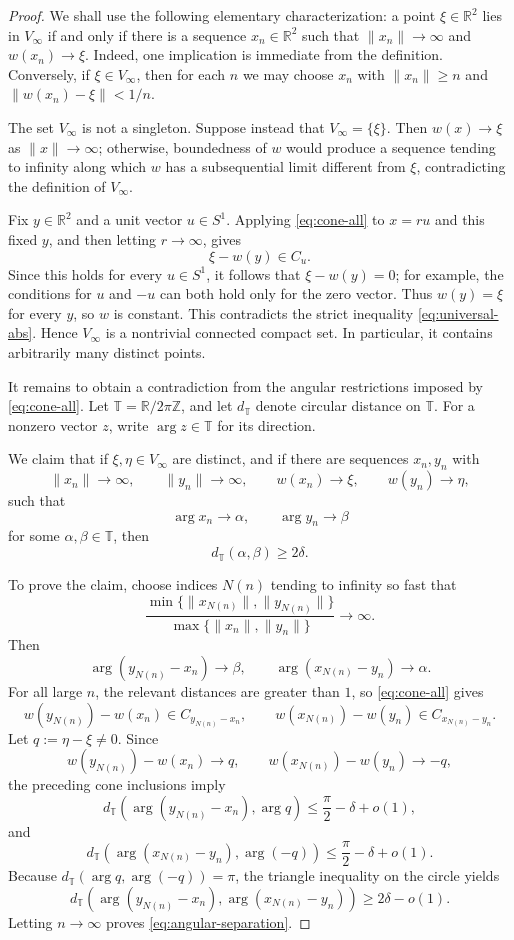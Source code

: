 \documentclass[10pt,a4paper]{amsart}
\begin{document}
\begin{proof}
We shall use the following elementary characterization: a point $\xi\in\mathbb R^2$ lies in $V_\infty$ if and only if there is a sequence $x_n\in\mathbb R^2$ such that $\|x_n\|\to\infty$ and $w(x_n)\to\xi$. Indeed, one implication is immediate from the definition. Conversely, if $\xi\in V_\infty$, then for each $n$ we may choose $x_n$ with $\|x_n\|\ge n$ and $\|w(x_n)-\xi\|<1/n$.

The set $V_\infty$ is not a singleton. Suppose instead that $V_\infty=\{\xi\}$. Then $w(x)\to\xi$ as $\|x\|\to\infty$; otherwise, boundedness of $w$ would produce a sequence tending to infinity along which $w$ has a subsequential limit different from $\xi$, contradicting the definition of $V_\infty$.

Fix $y\in\mathbb R^2$ and a unit vector $u\in S^1$. Applying \eqref{eq:cone-all} to $x=ru$ and this fixed $y$, and then letting $r\to\infty$, gives
\[
\xi-w(y)\in C_u.
\]
Since this holds for every $u\in S^1$, it follows that $\xi-w(y)=0$; for example, the conditions for $u$ and $-u$ can both hold only for the zero vector. Thus $w(y)=\xi$ for every $y$, so $w$ is constant. This contradicts the strict inequality \eqref{eq:universal-abs}. Hence $V_\infty$ is a nontrivial connected compact set. In particular, it contains arbitrarily many distinct points.

It remains to obtain a contradiction from the angular restrictions imposed by \eqref{eq:cone-all}. Let $\mathbb T=\mathbb R/2\pi\mathbb Z$, and let $d_{\mathbb T}$ denote circular distance on $\mathbb T$. For a nonzero vector $z$, write $\arg z\in\mathbb T$ for its direction.

We claim that if $\xi,\eta\in V_\infty$ are distinct, and if there are sequences $x_n,y_n$ with
\[
\|x_n\|\to\infty,
\qquad
\|y_n\|\to\infty,
\qquad
w(x_n)\to\xi,
\qquad
w(y_n)\to\eta,
\]
such that
\[
\arg x_n\to\alpha,
\qquad
\arg y_n\to\beta
\]
for some $\alpha,\beta\in\mathbb T$, then
\begin{equation}\label{eq:angular-separation}
d_{\mathbb T}(\alpha,\beta)\ge 2\delta .
\end{equation}

To prove the claim, choose indices $N(n)$ tending to infinity so fast that
\[
\frac{\min\{\|x_{N(n)}\|,\|y_{N(n)}\|\}}
{\max\{\|x_n\|,\|y_n\|\}}
\longrightarrow \infty .
\]
Then
\[
\arg (y_{N(n)}-x_n)\to\beta,
\qquad
\arg (x_{N(n)}-y_n)\to\alpha .
\]
For all large $n$, the relevant distances are greater than $1$, so \eqref{eq:cone-all} gives
\[
w(y_{N(n)})-w(x_n)\in C_{y_{N(n)}-x_n},
\qquad
w(x_{N(n)})-w(y_n)\in C_{x_{N(n)}-y_n}.
\]
Let $q:=\eta-\xi\ne 0$. Since
\[
w(y_{N(n)})-w(x_n)\to q,
\qquad
w(x_{N(n)})-w(y_n)\to -q,
\]
the preceding cone inclusions imply
\[
d_{\mathbb T}(\arg (y_{N(n)}-x_n),\arg q)
\le \frac{\pi}{2}-\delta+o(1),
\]
and
\[
d_{\mathbb T}(\arg (x_{N(n)}-y_n),\arg(-q))
\le \frac{\pi}{2}-\delta+o(1).
\]
Because $d_{\mathbb T}(\arg q,\arg(-q))=\pi$, the triangle inequality on the circle yields
\[
d_{\mathbb T}(\arg (y_{N(n)}-x_n),\arg (x_{N(n)}-y_n))
\ge 2\delta-o(1).
\]
Letting $n\to\infty$ proves \eqref{eq:angular-separation}.


\end{proof}
\end{document}
